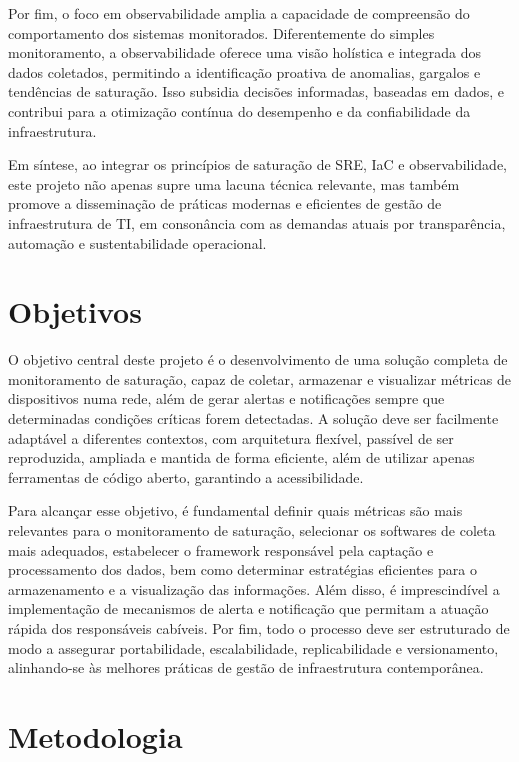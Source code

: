 Por fim, o foco em observabilidade amplia a capacidade de compreensão do comportamento dos sistemas monitorados. Diferentemente do simples monitoramento, a observabilidade oferece uma visão holística e integrada dos dados coletados, permitindo a identificação proativa de anomalias, gargalos e tendências de saturação. Isso subsidia decisões informadas, baseadas em dados, e contribui para a otimização contínua do desempenho e da confiabilidade da infraestrutura.

Em síntese, ao integrar os princípios de saturação de SRE, IaC e observabilidade, este projeto não apenas supre uma lacuna técnica relevante, mas também promove a disseminação de práticas modernas e eficientes de gestão de infraestrutura de TI, em consonância com as demandas atuais por transparência, automação e sustentabilidade operacional.

\section{Objetivos}
\label{section:Objetivos}

O objetivo central deste projeto é o desenvolvimento de uma solução completa de monitoramento de saturação, capaz de coletar, armazenar e visualizar métricas de dispositivos numa rede, além de gerar alertas e notificações sempre que determinadas condições críticas forem detectadas. A solução deve ser facilmente adaptável a diferentes contextos, com arquitetura flexível, passível de ser reproduzida, ampliada e mantida de forma eficiente, além de utilizar apenas ferramentas de código aberto, garantindo a acessibilidade.

Para alcançar esse objetivo, é fundamental definir quais métricas são mais relevantes para o monitoramento de saturação, selecionar os softwares de coleta mais adequados, estabelecer o framework responsável pela captação e processamento dos dados, bem como determinar estratégias eficientes para o armazenamento e a visualização das informações. Além disso, é imprescindível a implementação de mecanismos de alerta e notificação que permitam a atuação rápida dos responsáveis cabíveis. Por fim, todo o processo deve ser estruturado de modo a assegurar portabilidade, escalabilidade, replicabilidade e versionamento, alinhando-se às melhores práticas de gestão de infraestrutura contemporânea.

\section{Metodologia}
\label{section:Metodologia}

